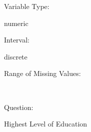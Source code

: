 \documentclass[
]{article}
\begin{document}
\begin{minipage}[t]{0.3\linewidth}

Variable Type:

\end{minipage}%
\begin{minipage}[t]{0.7\linewidth}

numeric

\end{minipage}

\begin{minipage}[t]{0.3\linewidth}

Interval:

\end{minipage}%
\begin{minipage}[t]{0.7\linewidth}

discrete

\end{minipage}

\begin{minipage}[t]{0.3\linewidth}

Range of Missing Values:

\end{minipage}%
\begin{minipage}[t]{0.7\linewidth}

~

\end{minipage}

\begin{minipage}[t]{0.3\linewidth}

Question:

\end{minipage}%
\begin{minipage}[t]{0.7\linewidth}

Highest Level of Education

\end{minipage}
\end{document}
